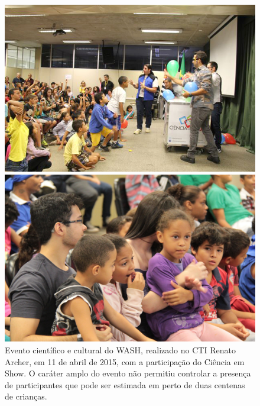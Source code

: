\documentclass[
12pt,		%
openright,	%
twoside,  %
a4paper,			%
chapter=TITLE,		%
english,			%
french,				%
spanish,			%
brazil				%
]{USPSC-classe/USPSC}
\begin{document}
\captionsetup{format=plain}
\begin{figure}[max size={\textwidth}{\textheight}]

\centering


\begin{minipage}[b]{0.4\linewidth}
        \centering
                \includegraphics[width=1.0\linewidth]{../../imagens/Evento-Ciencia-Em-Show.jpg}
                \caption{Evento cient\'{i}fico e cultural do WASH, realizado no CTI Renato Archer, em 11 de abril de 2015, com a participa\c{c}\~ao do Ci\^encia em Show. O car\'ater amplo do evento n\~ao permitiu controlar a presen\c{c}a de participantes que pode ser estimada em perto de duas centenas de crian\c{c}as.}
                \label{5340059e38852932c32c5ce8624858fef8a1f3f0}
\end{minipage}%
\hspace{0.5cm}
\begin{minipage}[b]{0.4\linewidth}
        \centering
                \includegraphics[width=1.0\linewidth]{../../imagens/dia-das-criancas-2022-10-03-menor.JPG}

\end{minipage}
\end{figure}
\end{document}
